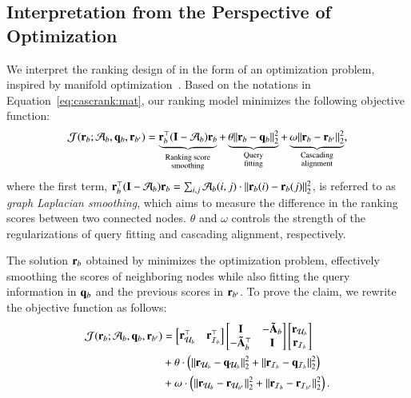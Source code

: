 \subsection{Interpretation from the Perspective of Optimization}
\label{sec:proposed:reg}
We interpret the ranking design of \method in the form of an optimization problem, inspired by manifold optimization~\cite{ZhouZBLWS03,AgarwalA06, HeHGKW17}. 
Based on the notations in Equation~\eqref{eq:cascrank:mat}, our ranking model minimizes the following objective function:
\begin{align}
    \label{eq:reg:obj}
    \mathcal{J}(\mathbf{r}_{b}; \mathcal{A}_{b}, \mathbf{q}_{b}, \mathbf{r}_{b'}) = \underbrace{\mathbf{r}_{b}^{\top}(\mathbf{I} - \mathcal{A}_{b})\mathbf{r}_{b}}_{_{\substack{\text{Ranking score} \\ \text{smoothing}}}} + \underbrace{\theta\lVert\mathbf{r}_{b} - \mathbf{q}_{b} \rVert_{2}^{2}}_{\substack{\text{Query} \\ \text{fitting}}} + \underbrace{\omega\lVert\mathbf{r}_{b} - \mathbf{r}_{b'} \rVert_{2}^{2}}_{\substack{\text{Cascading} \\ \text{alignment}}}, 
\end{align}
where the first term, $\mathbf{r}_{b}^{\top}(\mathbf{I} - \mathcal{A}_{b})\mathbf{r}_{b} = \sum_{i,j}\mathcal{A}_b(i, j)\cdot\lVert\mathbf{r}_{b}(i) - \mathbf{r}_{b}(j)\rVert_{2}^{2}$, is referred to as \textit{graph Laplacian smoothing}, which aims to measure the difference in the ranking scores between two connected nodes.
$\theta$ and $\omega$ controls the strength of the regularizations of query fitting and cascading alignment, respectively.

The solution $\mathbf{r}_{b}$ obtained by \method minimizes the optimization problem, effectively smoothing the scores of neighboring nodes while also fitting the query information in $\mathbf{q}_{b}$ and the previous scores in $\mathbf{r}_{b'}$.
To prove the claim, we rewrite the objective function as follows:
\begin{align*}
    \begin{split}
    \mathcal{J}(\mathbf{r}_{b}; \mathcal{A}_{b}, \mathbf{q}_{b}, \mathbf{r}_{b'})  &= 
    \begin{bmatrix}
        \mathbf{r}_{\mathcal{U}_{b}}^{\top} & \mathbf{r}_{\mathcal{I}_{b}}^{\top}
    \end{bmatrix}
    \begin{bmatrix}
        \mathbf{I} & -\mathbf{\tilde{A}}_{b} \\
        -\mathbf{\tilde{A}}_{b}^{\top} & \mathbf{I} 
    \end{bmatrix}
    \begin{bmatrix}
        \mathbf{r}_{\mathcal{U}_{b}} \\ \mathbf{r}_{\mathcal{I}_{b}}
    \end{bmatrix} \\
    &+ \theta \cdot \left( \lVert \mathbf{r}_{\mathcal{U}_{b}} - \mathbf{q}_{\mathcal{U}_{b}} \rVert_{2}^{2} + \lVert \mathbf{r}_{\mathcal{I}_{b}} - \mathbf{q}_{\mathcal{I}_{b}} \rVert_{2}^{2} \right) \\
    &+ \omega \cdot \left(\lVert \mathbf{r}_{\mathcal{U}_{b}} - \mathbf{r}_{\mathcal{U}_{b'}} \rVert_{2}^{2} + \lVert \mathbf{r}_{\mathcal{I}_{b}} - \mathbf{r}_{\mathcal{I}_{b'}} \rVert_{2}^{2} \right). 
    \end{split}
\end{align*}

